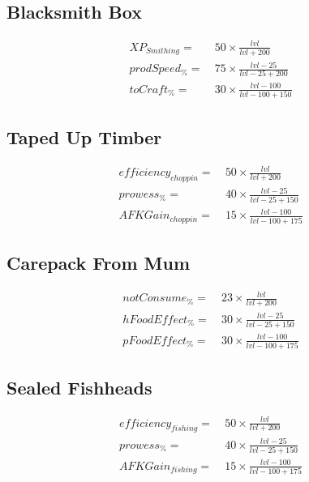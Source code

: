     \subsection{Blacksmith Box}
        \begin{align*}
            XP_{Smithing} = &\  50 \times \frac{{lvl}}{{lvl}+200}
            \\
            prodSpeed_\% = &\  75 \times \frac{{lvl}-25}{{lvl}-25+200}
            \\
            toCraft_\% = &\  30 \times \frac{{lvl}-100}{{lvl}-100+150}
        \end{align*}

    \subsection{Taped Up Timber}
        \begin{align*}
            efficiency_{choppin} = &\   50 \times \frac{{lvl}}{{lvl}+200}
            \\
            prowess_\% = &\  40 \times \frac{{lvl}-25}{{lvl}-25+150}
            \\
            AFKGain_{choppin}= &\  15 \times \frac{{lvl}-100}{{lvl}-100+175}
        \end{align*}

    \subsection{Carepack From Mum}
        \begin{align*}
            notConsume_\%= &\  23 \times \frac{{lvl}}{{lvl}+200}
            \\
            hFoodEffect_\%= &\  30 \times \frac{{lvl}-25}{{lvl}-25+150}
            \\
            pFoodEffect_\% = &\  30 \times \frac{{lvl}-100}{{lvl}-100+175}
        \end{align*}

    \subsection{Sealed Fishheads}
        \begin{align*}
            efficiency_{fishing} = &\  50 \times \frac{{lvl}}{{lvl}+200} 
            \\
            prowess_\% = &\  40 \times \frac{{lvl}-25}{{lvl}-25+150}
            \\
            AFKGain_{fishing} = &\  15 \times \frac{{lvl}-100}{{lvl}-100+175}
        \end{align*}

